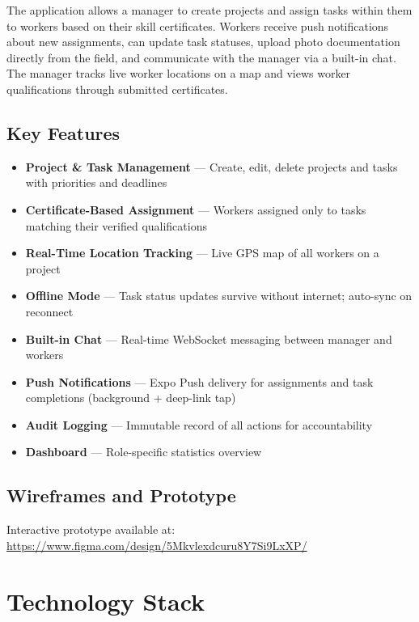 \documentclass[12pt,a4paper]{article}
\begin{document}
The application allows a manager to create projects and assign tasks within them to workers based on their skill certificates. Workers receive push notifications about new assignments, can update task statuses, upload photo documentation directly from the field, and communicate with the manager via a built-in chat. The manager tracks live worker locations on a map and views worker qualifications through submitted certificates.

\subsection*{Key Features}
\begin{itemize}[noitemsep]
    \item \textbf{Project \& Task Management} --- Create, edit, delete projects and tasks with priorities and deadlines
    \item \textbf{Certificate-Based Assignment} --- Workers assigned only to tasks matching their verified qualifications
    \item \textbf{Real-Time Location Tracking} --- Live GPS map of all workers on a project
    \item \textbf{Offline Mode} --- Task status updates survive without internet; auto-sync on reconnect
    \item \textbf{Built-in Chat} --- Real-time WebSocket messaging between manager and workers
    \item \textbf{Push Notifications} --- Expo Push delivery for assignments and task completions (background + deep-link tap)
    \item \textbf{Audit Logging} --- Immutable record of all actions for accountability
    \item \textbf{Dashboard} --- Role-specific statistics overview
\end{itemize}

\subsection*{Wireframes and Prototype}
\begin{sloppypar}
Interactive prototype available at: \url{https://www.figma.com/design/5Mkvlexdcuru8Y7Si9LxXP/}
\end{sloppypar}

\section{Technology Stack}
\end{document}
